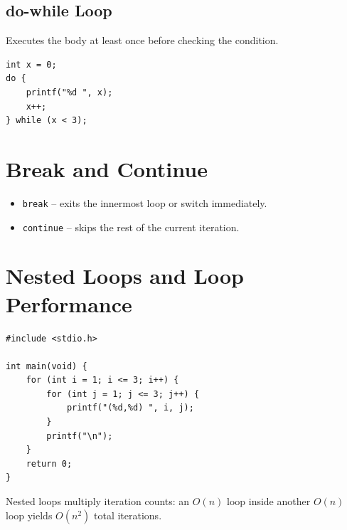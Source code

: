 \documentclass[11pt,a4paper]{article}
\begin{document}
\subsection{do-while Loop}
Executes the body at least once before checking the condition.
\begin{lstlisting}
int x = 0;
do {
    printf("%d ", x);
    x++;
} while (x < 3);
\end{lstlisting}

\section{Break and Continue}
\begin{itemize}
  \item \texttt{break} -- exits the innermost loop or switch immediately.
  \item \texttt{continue} -- skips the rest of the current iteration.
\end{itemize}

\section{Nested Loops and Loop Performance}
\begin{lstlisting}
#include <stdio.h>

int main(void) {
    for (int i = 1; i <= 3; i++) {
        for (int j = 1; j <= 3; j++) {
            printf("(%d,%d) ", i, j);
        }
        printf("\n");
    }
    return 0;
}
\end{lstlisting}

Nested loops multiply iteration counts: an $O(n)$ loop inside another $O(n)$
loop yields $O(n^2)$ total iterations.
\end{document}
